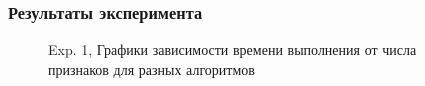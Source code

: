 \documentclass[10pt]{article}
\begin{document}
\begin{itemize}
            \subsubsection*{Результаты эксперимента}
            {
                \begin{figure}[h]
            	    \begin{minipage}[h]{0.51\linewidth}
            	    \end{minipage}
            	    \hfill
            	    \begin{minipage}[h]{0.51\linewidth}
            	    \end{minipage}
            	    \caption{Exp. 1, Графики зависимости времени выполнения от числа признаков для разных алгоритмов}
            	    \label{ris:image1}
                \end{figure}
            }
	        

\end{itemize}
\end{document}
